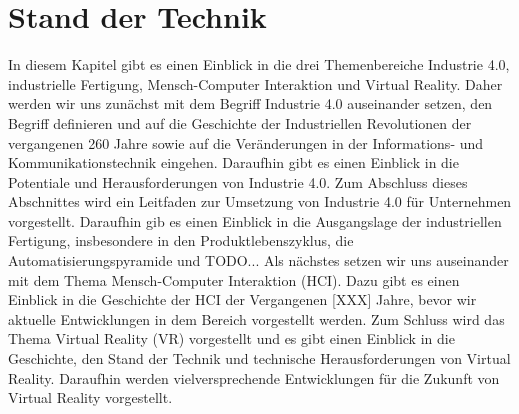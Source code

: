 \chapter{Stand der Technik}\label{cha:StandDerTechnik}

In diesem Kapitel gibt es einen Einblick in die drei Themenbereiche Industrie 4.0, industrielle Fertigung, Mensch-Computer Interaktion und Virtual Reality.
\newline\newline
Daher werden wir uns zunächst mit dem Begriff Industrie 4.0 auseinander setzen, den Begriff definieren und auf die Geschichte der Industriellen Revolutionen der vergangenen 260 Jahre sowie auf die Veränderungen in der Informations- und Kommunikationstechnik eingehen. Daraufhin gibt es einen Einblick in die Potentiale und Herausforderungen von Industrie 4.0. Zum Abschluss dieses Abschnittes wird ein Leitfaden zur Umsetzung von Industrie 4.0 für Unternehmen vorgestellt.
\newline\newline
Daraufhin gib es einen Einblick in die Ausgangslage der industriellen Fertigung, insbesondere in den Produktlebenszyklus, die Automatisierungspyramide und TODO...
\newline\newline
Als nächstes setzen wir uns auseinander mit dem Thema Mensch-Computer Interaktion (HCI). Dazu gibt es einen Einblick in die Geschichte der HCI der Vergangenen [XXX] Jahre, bevor wir aktuelle Entwicklungen in dem Bereich vorgestellt werden.
\newline\newline
Zum Schluss wird das Thema Virtual Reality (VR) vorgestellt und es gibt einen Einblick in die Geschichte, den Stand der Technik und technische Herausforderungen von Virtual Reality. Daraufhin werden vielversprechende Entwicklungen für die Zukunft von Virtual Reality vorgestellt.


